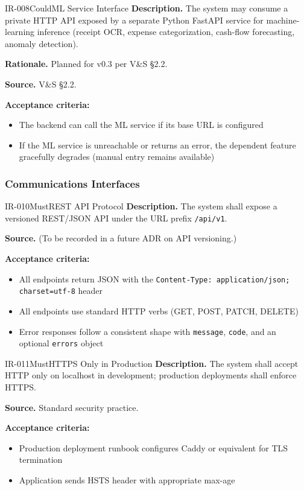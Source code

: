 \documentclass[11pt,a4paper]{article}
\begin{document}
\begin{requirement}{IR-008}{Could}{ML Service Interface}
\textbf{Description.} The system may consume a private HTTP API exposed by a separate Python FastAPI service for machine-learning inference (receipt OCR, expense categorization, cash-flow forecasting, anomaly detection).

\textbf{Rationale.} Planned for v0.3 per V\&S \S2.2.

\textbf{Source.} V\&S \S2.2.

\textbf{Acceptance criteria:}
\begin{itemize}
    \item The backend can call the ML service if its base URL is configured
    \item If the ML service is unreachable or returns an error, the dependent feature gracefully degrades (manual entry remains available)
\end{itemize}
\end{requirement}

\subsubsection{Communications Interfaces}

\begin{requirement}{IR-010}{Must}{REST API Protocol}
\textbf{Description.} The system shall expose a versioned REST/JSON API under the URL prefix \texttt{/api/v1}.

\textbf{Source.} (To be recorded in a future ADR on API versioning.)

\textbf{Acceptance criteria:}
\begin{itemize}
    \item All endpoints return JSON with the \texttt{Content-Type: application/json; charset=utf-8} header
    \item All endpoints use standard HTTP verbs (GET, POST, PATCH, DELETE)
    \item Error responses follow a consistent shape with \texttt{message}, \texttt{code}, and an optional \texttt{errors} object
\end{itemize}
\end{requirement}

\begin{requirement}{IR-011}{Must}{HTTPS Only in Production}
\textbf{Description.} The system shall accept HTTP only on localhost in development; production deployments shall enforce HTTPS.

\textbf{Source.} Standard security practice.

\textbf{Acceptance criteria:}
\begin{itemize}
    \item Production deployment runbook configures Caddy or equivalent for TLS termination
    \item Application sends HSTS header with appropriate max-age
\end{itemize}
\end{requirement}
\end{document}
